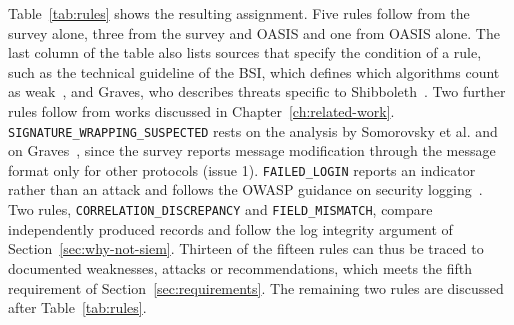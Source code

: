 \documentclass[../main.tex]{subfiles}
\begin{document}
Table~\ref{tab:rules} shows the resulting assignment. 
Five rules follow from the survey alone, three from the survey and OASIS and one from OASIS alone. 
The last column of the table also lists sources that specify the condition of a rule, such as the 
technical guideline of the BSI, which defines which algorithms count as weak~\cite{BSITR02102}, 
and Graves, who describes threats specific to Shibboleth~\cite{ShibbolethGIAC}. 
Two further rules follow from works discussed in Chapter~\ref{ch:related-work}. 
\texttt{SIGNATURE\_\allowbreak{}WRAPPING\_\allowbreak{}SUSPECTED} rests on the analysis by 
Somorovsky et al. and on Graves~\cite{BreakingSAML, ShibbolethGIAC}, since the survey reports 
message modification through the message format only for other protocols (issue 1). 
\texttt{FAILED\_\allowbreak{}LOGIN} reports an indicator rather than an attack and follows the 
OWASP guidance on security logging~\cite{OWASPA09}. 
Two rules, \texttt{CORRELATION\_\allowbreak{}DISCREPANCY} and \texttt{FIELD\_\allowbreak{}MISMATCH}, 
compare independently produced records and follow the log integrity argument of Section~\ref{sec:why-not-siem}. 
Thirteen of the fifteen rules can thus be traced to documented weaknesses, attacks or 
recommendations, which meets the fifth requirement of Section~\ref{sec:requirements}. 
The remaining two rules are discussed after Table~\ref{tab:rules}.
\end{document}
